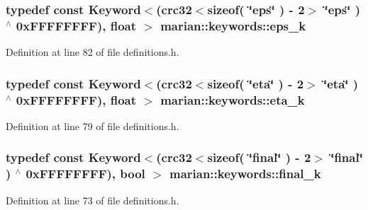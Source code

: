 \subsubsection[{\texorpdfstring{eps\+\_\+k}{eps_k}}]{\setlength{\rightskip}{0pt plus 5cm}typedef const {\bf Keyword}$<$({\bf crc32}$<$sizeof( \char`\"{}eps\char`\"{} ) -\/ 2$>$ \char`\"{}{\bf eps}\char`\"{} ) $^\wedge$ 0x\+F\+F\+F\+F\+F\+F\+F\+F), float $>$ marian\+::keywords\+::eps\+\_\+k}\hypertarget{namespacemarian_1_1keywords_a5f02b3d29c552bc4052504dc4d09c512}{}\label{namespacemarian_1_1keywords_a5f02b3d29c552bc4052504dc4d09c512}


Definition at line 82 of file definitions.\+h.

\subsubsection[{\texorpdfstring{eta\+\_\+k}{eta_k}}]{\setlength{\rightskip}{0pt plus 5cm}typedef const {\bf Keyword}$<$({\bf crc32}$<$sizeof( \char`\"{}eta\char`\"{} ) -\/ 2$>$ \char`\"{}{\bf eta}\char`\"{} ) $^\wedge$ 0x\+F\+F\+F\+F\+F\+F\+F\+F), float $>$ marian\+::keywords\+::eta\+\_\+k}\hypertarget{namespacemarian_1_1keywords_a434be77c98bf73e98aecaf646e223289}{}\label{namespacemarian_1_1keywords_a434be77c98bf73e98aecaf646e223289}


Definition at line 79 of file definitions.\+h.

\subsubsection[{\texorpdfstring{final\+\_\+k}{final_k}}]{\setlength{\rightskip}{0pt plus 5cm}typedef const {\bf Keyword}$<$({\bf crc32}$<$sizeof( \char`\"{}final\char`\"{} ) -\/ 2$>$ \char`\"{}{\bf final}\char`\"{} ) $^\wedge$ 0x\+F\+F\+F\+F\+F\+F\+F\+F), bool $>$ marian\+::keywords\+::final\+\_\+k}\hypertarget{namespacemarian_1_1keywords_a6416d66a33fc4d5ed5137bb91d826468}{}\label{namespacemarian_1_1keywords_a6416d66a33fc4d5ed5137bb91d826468}


Definition at line 73 of file definitions.\+h.

